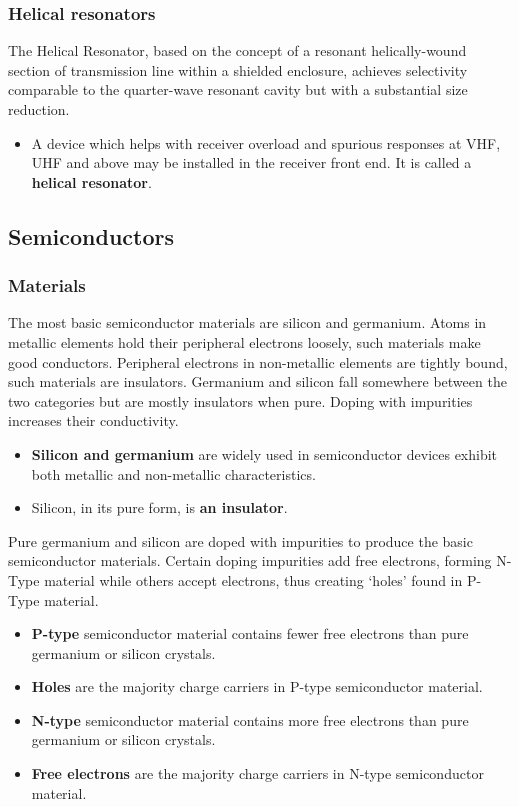 \documentclass[letterpaper]{article}
\begin{document}
        \subsubsection{Helical resonators}
        The Helical Resonator, based on the concept of a resonant helically-wound section of transmission line within a shielded enclosure, achieves selectivity comparable to the quarter-wave resonant cavity but with a substantial size reduction.
        \begin{itemize}
            \item A device which helps with receiver overload and spurious responses at VHF, UHF and above may be installed in the receiver front end. It is called a \textbf{helical resonator}.
        \end{itemize}

        \newpage

        \subsection{Semiconductors}
        \subsubsection{Materials}
        The most basic semiconductor materials are silicon and germanium.
        Atoms in metallic elements hold their peripheral electrons loosely, such materials make good conductors.
        Peripheral electrons in non-metallic elements are tightly bound, such materials are insulators.
        Germanium and silicon fall somewhere between the two categories but are mostly insulators when pure.
        Doping with impurities increases their conductivity.
        \begin{itemize}
            \item \textbf{Silicon and germanium} are widely used in semiconductor devices exhibit both metallic and non-metallic characteristics.
            \item Silicon, in its pure form, is \textbf{an insulator}.
        \end{itemize}

        Pure germanium and silicon are doped with impurities to produce the basic semiconductor materials.
        Certain doping impurities add free electrons, forming N-Type material while others accept electrons, thus creating `holes' found in P-Type material.
        \begin{itemize}
            \item \textbf{P-type} semiconductor material contains fewer free electrons than pure germanium or silicon crystals.
            \item \textbf{Holes} are the majority charge carriers in P-type semiconductor material.
            \item \textbf{N-type} semiconductor material contains more free electrons than pure germanium or silicon crystals.
            \item \textbf{Free electrons} are the majority charge carriers in N-type semiconductor material.
        \end{itemize}
\end{document}
